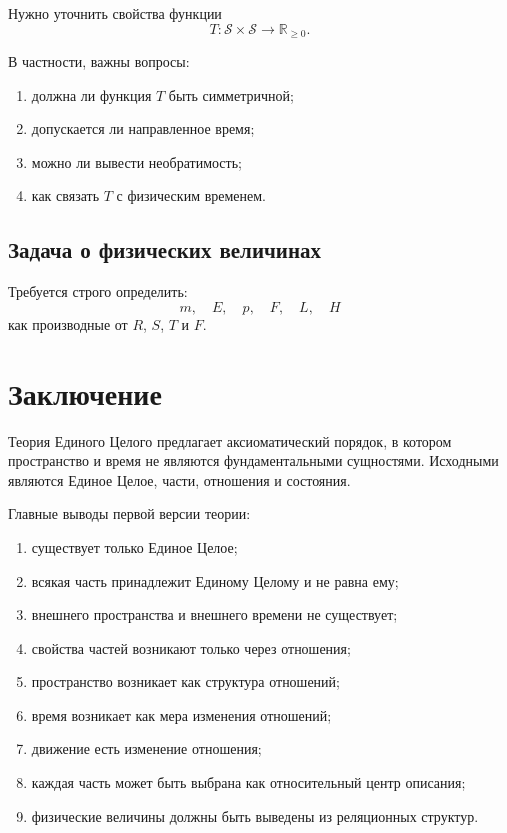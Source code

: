 \documentclass[12pt,a4paper,oneside]{book}
\theoremstyle{definition}
\theoremstyle{plain}
\theoremstyle{remark}
\newcommand{\Rel}{R}
\newcommand{\State}{S}
\newcommand{\States}{\mathcal S}
\begin{document}
Нужно уточнить свойства функции
\[
T:\States\times\States\to\mathbb R_{\ge0}.
\]

В частности, важны вопросы:
\begin{enumerate}
    \item должна ли функция \(T\) быть симметричной;
    \item допускается ли направленное время;
    \item можно ли вывести необратимость;
    \item как связать \(T\) с физическим временем.
\end{enumerate}

\section{Задача о физических величинах}

Требуется строго определить:
\[
m,\quad E,\quad p,\quad F,\quad L,\quad H
\]
как производные от \(\Rel\), \(\State\), \(T\) и \(F\).

\chapter{Заключение}

Теория Единого Целого предлагает аксиоматический порядок, в котором пространство и время не являются фундаментальными сущностями. Исходными являются Единое Целое, части, отношения и состояния.

Главные выводы первой версии теории:

\begin{enumerate}
    \item существует только Единое Целое;
    \item всякая часть принадлежит Единому Целому и не равна ему;
    \item внешнего пространства и внешнего времени не существует;
    \item свойства частей возникают только через отношения;
    \item пространство возникает как структура отношений;
    \item время возникает как мера изменения отношений;
    \item движение есть изменение отношения;
    \item каждая часть может быть выбрана как относительный центр описания;
    \item физические величины должны быть выведены из реляционных структур.
\end{enumerate}
\end{document}

